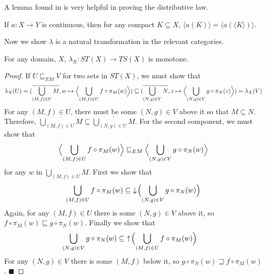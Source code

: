 A lemma found in \cite{berger2010domain} is very helpful in proving the distributive law.
\begin{lemma}
If $a:X\rightarrow Y$ is continuous, then for any compact $K\subseteq X$, $\langle a(K)\rangle = \langle a(\langle K\rangle)\rangle$.
\end{lemma}
Now we show $\lambda$ is a natural transformation in the relevant categories.
\begin{proposition}
For any domain, $X$, $\lambda_X:ST(X)\to TS(X)$ is monotone.
\end{proposition}
\begin{proof}
If $U\sqsubseteq_{EM} V$ for two sets in $ST(X)$, we must show that \[\lambda_X(U) = (\overline{\bigcup_{(M,f)\in U} M}, w\mapsto\Bigl\langle\bigcup_{(M,f)\in U} f\circ \pi_M(w) \Bigr\rangle) \sqsubseteq (\overline{\bigcup_{(N,g)\in V} N},z\mapsto\Bigl\langle\bigcup_{(N,g)\in V} g\circ \pi_N(z) \Bigr\rangle) = \lambda_X(V)\]
For any $(M,f)\in U$, there must be some $(N,g)\in V$ above it so that $M\subseteq N$.  Therefore, $\overline{\bigcup_{(M,f)\in U} M} \subseteq \overline{\bigcup_{(N,g)\in U} M}$.  For the second component, we must show that
\begin{align*}
\Bigl\langle\bigcup_{(M,f)\in U} f\circ \pi_M(w) \Bigr\rangle &\sqsubseteq_{EM}
\Bigl\langle\bigcup_{(N,g)\in V} g\circ \pi_N(w) \Bigr\rangle \\
\end{align*}
for any $w$ in $\overline{\bigcup_{(M,f)\in U}M}$.  First we show that
\begin{align*}
\bigcup_{(M,f)\in U} f\circ \pi_M(w) &\subseteq
\,\,\downarrow\! \Bigl(\bigcup_{(N,g)\in V} g\circ \pi_N(w)\Bigr) \\
\end{align*}
Again, for any $(M,f)\in U$ there is some $(N,g)\in V$ above it, so 
$f\circ \pi_M(w) \sqsubseteq g\circ \pi_N(w)$.  Finally we show that 
\begin{align*}
\bigcup_{(N,g)\in V} g\circ \pi_N(w) &\subseteq
\,\,\uparrow\! \Bigl(\bigcup_{(M,f)\in U} f\circ \pi_M(w)\Bigr) 
\end{align*}
For any $(N,g)\in V$ there is some $(M,f)$ below it, so 
$g\circ \pi_N(w) \sqsupseteq f\circ \pi_M(w)$. 
\hfill $\blacksquare$
\end{proof}

